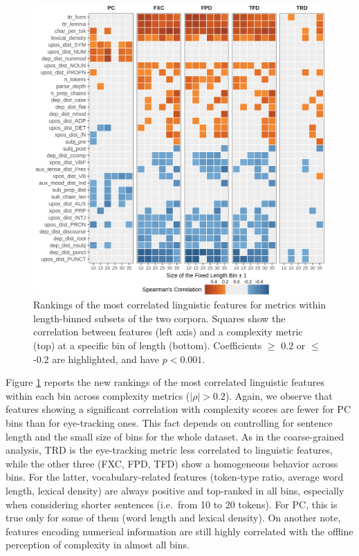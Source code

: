 \documentclass[a4paper, nobind]{templates/ociamthesis}
\begin{document}
\begin{figure}

{\centering \includegraphics[width=0.95\linewidth]{figures/3_feat_bin_heatmap} 

}

\caption{Rankings of the most correlated linguistic features for metrics within length-binned subsets of the two corpora. Squares show the correlation between features (left axis) and a complexity metric (top) at a specific bin of length (bottom). Coefficients \(\geq\) 0.2 or \(\leq\) -0.2 are highlighted, and have \(p<0.001\).}\label{fig:feat-bin-heatmap}
\end{figure}

Figure \ref{fig:feat-bin-heatmap} reports the new rankings of the most correlated linguistic features within each bin across complexity metrics (\(|\rho| > 0.2\)). Again, we observe that features showing a significant correlation with complexity scores are fewer for PC bins than for eye-tracking ones. This fact depends on controlling for sentence length and the small size of bins for the whole dataset. As in the coarse-grained analysis, TRD is the eye-tracking metric less correlated to linguistic features, while the other three (FXC, FPD, TFD) show a homogeneous behavior across bins. For the latter, vocabulary-related features (token-type ratio, average word length, lexical density) are always positive and top-ranked in all bins, especially when considering shorter sentences (i.e.~from 10 to 20 tokens). For PC, this is true only for some of them (word length and lexical density). On another note, features encoding numerical information are still highly correlated with the offline perception of complexity in almost all bins.
\end{document}
